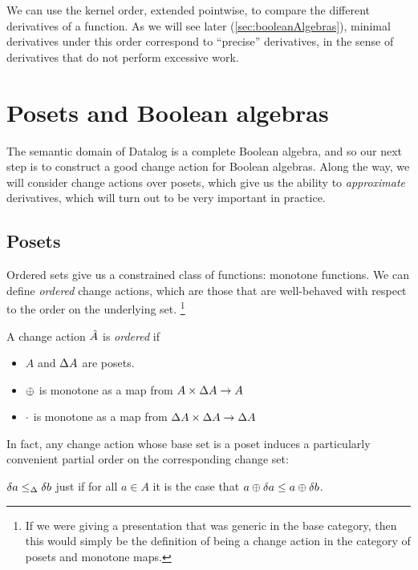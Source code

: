 We can use the kernel order, extended pointwise, to compare the different derivatives of a function.
As we will see later (\cref{sec:booleanAlgebras}), minimal derivatives under
this order correspond to ``precise'' derivatives, in the sense of derivatives that do not perform
excessive work.

\section{Posets and Boolean algebras}
\label{sec:moreStructures}

The semantic domain of Datalog is a complete Boolean algebra, and so our next
step is to construct a good change action for Boolean algebras. Along the way, we
will consider change actions over posets, which give us the ability to
\emph{approximate} derivatives, which will turn out to be very important in practice.

\subsection{Posets}

Ordered sets give us a constrained class of functions: monotone
functions. We can define \emph{ordered} change actions, which are those that
are well-behaved with respect to the order on the underlying set.
\footnote{If we were giving a presentation that was
generic in the base category, then this would simply be the definition of being
a change action in the category of posets and monotone maps.}

\begin{defn}
  A change action $\hat{A}$ is \emph{ordered} if
  \begin{itemize}
    \item $A$ and $\Delta A$ are posets.
    \item $\oplus$ is monotone as a map from $A \times \Delta A \rightarrow A$
    \item $\cdot$ is monotone as a map from $\Delta A \times \Delta A \rightarrow \Delta A$
  \end{itemize}
\end{defn}

In fact, any change action whose base set is a poset induces a particularly convenient partial order
on the corresponding change set:

\begin{defn}
  $\delta a \leq_\Delta \delta b$ just if for all $a \in A$ it is the case that
  $a \oplus \delta a \leq a \oplus \delta b$.
\end{defn}

